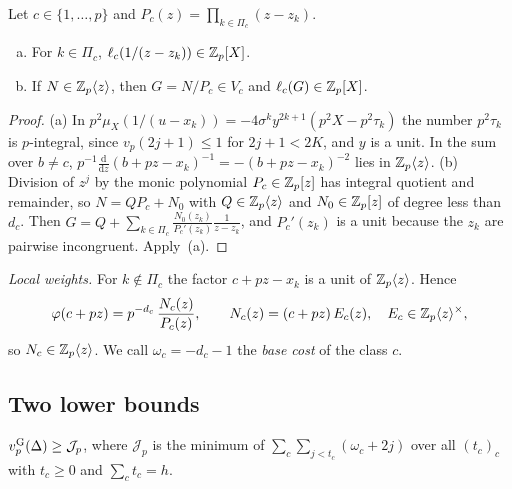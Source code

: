 \begin{lemma}[integrality]\label{lem:local-integrality}
Let $c\in\{1,\dots,p\}$ and $P_c(z)=\prod_{k\in\Pi_c}(z-z_k)$.
\begin{enumerate}[(a)]
\item For $k\in\Pi_c$, $\ell_c(1/(z-z_k))\in\mathbb{Z}_p[X]$.
\item If $N\in\mathbb{Z}_p\langle z\rangle$, then $G=N/P_c\in V_c$ and $\ell_c(G)\in\mathbb{Z}_p[X]$.
\end{enumerate}
\end{lemma}

\begin{proof}
(a) In $p^2\mu_X(1/(u-x_k))=-4\sigma^ky^{2k+1}(p^2X-p^2\tau_k)$ the number $p^2\tau_k$ is
$p$-integral, since $v_p(2j+1)\le1$ for $2j+1<2K$, and $y$ is a unit. In the sum over $b\ne c$,
$p^{-1}\frac{\mathrm d}{\mathrm dz}(b+pz-x_k)^{-1}=-(b+pz-x_k)^{-2}$ lies in $\mathbb{Z}_p\langle z\rangle$.
(b) Division of $z^j$ by the monic polynomial $P_c\in\mathbb{Z}_p[z]$ has integral quotient and
remainder, so $N=QP_c+N_0$ with $Q\in\mathbb{Z}_p\langle z\rangle$ and $N_0\in\mathbb{Z}_p[z]$ of degree less than $d_c$.
Then $G=Q+\sum_{k\in\Pi_c}\frac{N_0(z_k)}{P_c'(z_k)}\frac1{z-z_k}$, and $P_c'(z_k)$ is a unit
because the $z_k$ are pairwise incongruent. Apply~(a).
\end{proof}

\emph{Local weights.} For $k\notin\Pi_c$ the factor $c+pz-x_k$ is a unit of $\mathbb{Z}_p\langle z\rangle$. Hence
\begin{equation}\label{eq:local-weight}
  \varphi(c+pz)=p^{-d_c}\,\frac{N_c(z)}{P_c(z)},\qquad
  N_c(z)=(c+pz)\,E_c(z),\quad E_c\in\mathbb{Z}_p\langle z\rangle^\times,
\end{equation}
so $N_c\in\mathbb{Z}_p\langle z\rangle$. We call $\omega_c=-d_c-1$ the \emph{base cost} of the class $c$.

\subsection{Two lower bounds}\label{subsec:two-bounds}

\begin{proposition}\label{prop:jet}
$v_{p}^{\mathrm{G}}(\Delta)\ge\mathcal J_p$, where $\mathcal J_p$ is the minimum of
$\sum_c\sum_{j<t_c}(\omega_c+2j)$ over all $(t_c)_{c}$ with $t_c\ge0$ and $\sum_ct_c=h$.
\end{proposition}

